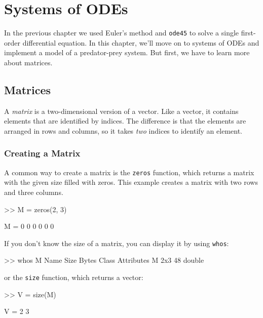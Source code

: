 \chapter{Systems of ODEs}
\label{systems}


In the previous chapter we used Euler's method and \lstinline{ode45} to solve a single first-order differential equation.  In this chapter, we'll move on to systems of ODEs and implement a model of a predator-prey system.  But first, we have to learn more about matrices.


\section{Matrices}

A \emph{matrix} is a two-dimensional version of a vector.  Like a vector,
it contains elements that are identified by indices.  The difference
is that the elements are arranged in rows and columns, so it takes
\emph{two} indices to identify an element.

\subsection{Creating a Matrix}


A common way to create a matrix is the \lstinline{zeros} function,
which returns a matrix with the given size filled with zeros.
This example creates a matrix with two rows and three columns.

\begin{code}
>> M = zeros(2, 3)

M =  0     0     0
     0     0     0
\end{code}

If you don't know the size of a matrix, you can display it by using \lstinline{whos}:

\begin{code}
>> whos M
  Name      Size            Bytes  Class     Attributes
  M         2x3                48  double
\end{code}
or the \lstinline{size} function, which returns a vector:


\begin{code}
>> V = size(M)

V = 2    3
\end{code}

